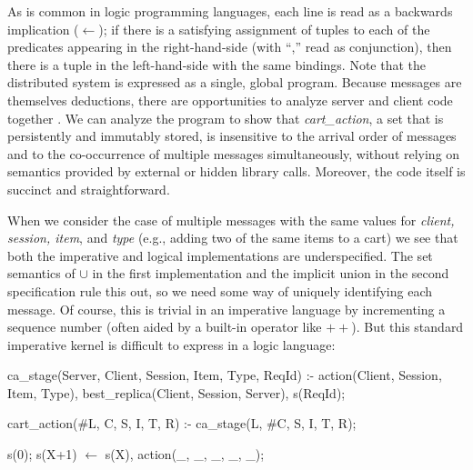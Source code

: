 As is common in logic programming languages, each line is read as a backwards
implication ($\leftarrow$); if there is a satisfying assignment of tuples to each of
the predicates appearing in the right-hand-side (with ``,'' read as conjunction), 
then there is a tuple in the left-hand-side with the same bindings.
Note that the distributed system is expressed as a single, global program.
Because messages are themselves deductions, there are opportunities to 
analyze server and client code together .  We can analyze the program to 
show that {\em cart\_action}, a set that is persistently and immutably
stored, is insensitive to the arrival order of messages 
and to the co-occurrence of multiple messages simultaneously, without relying
on semantics provided by external or hidden library calls.   Moreover, the code 
itself is succinct and straightforward. 


When we consider the case of multiple messages with the same values for
{\em client, session, item}, and {\em type} (e.g., adding two of the same items to a cart)
we see that both the imperative and logical implementations are underspecified.
The set semantics of $\cup$ in the first implementation and the implicit union 
in the second specification rule this out, so we need some way of uniquely identifying each message.
Of course, this is trivial in an imperative language by incrementing a sequence number (often aided by a built-in operator like $++$).
But this standard imperative kernel is difficult to express in a logic language:

\begin{Dedalus}
ca_stage(Server, Client, Session, Item, Type, ReqId) :-
  action(Client, Session, Item, Type),
  best_replica(Client, Session, Server),
  s(ReqId);

cart_action(#L, C, S, I, T, R) :-
  ca_stage(L, #C, S, I, T, R);

s(0);
s(X+1) \(\leftarrow\)  s(X), action(_, _, _, _, _);
\end{Dedalus}

